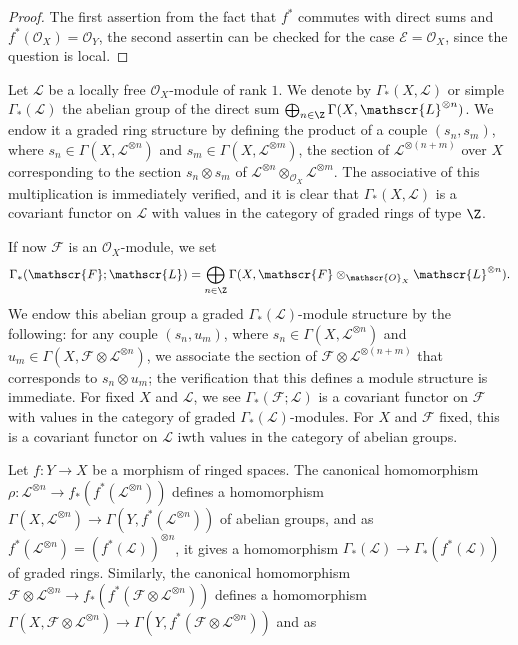 \begin{proof}
The first assertion from the fact that $f^*$ commutes with direct sums and $f^*(\mathscr{O}_X)=\mathscr{O}_Y$, the second assertin can be checked for the case $\mathscr{E}=\mathscr{O}_X$, since the question is local.
\end{proof}
Let $\mathscr{L}$ be a locally free $\mathscr{O}_X$-module of rank $1$. We denote by $\Gamma_*(X,\mathscr{L})$ or simple $\Gamma_*(\mathscr{L})$ the abelian group of the direct sum $\bigoplus_{n\in\Z}\Gamma(X,\mathscr{L}^{\otimes n})$. We endow it a graded ring structure by defining the product of a couple $(s_n,s_m)$, where $s_n\in\Gamma(X,\mathscr{L}^{\otimes n})$ and $s_m\in\Gamma(X,\mathscr{L}^{\otimes m})$, the section of $\mathscr{L}^{\otimes(n+m)}$ over $X$ corresponding to the section $s_n\otimes s_m$ of $\mathscr{L}^{\otimes n}\otimes_{\mathscr{O}_X}\mathscr{L}^{\otimes m}$. The associative of this multiplication is immediately verified, and it is clear that $\Gamma_*(X,\mathscr{L})$ is a covariant functor on $\mathscr{L}$ with values in the category of graded rings of type $\Z$.\par
If now $\mathscr{F}$ is an $\mathscr{O}_X$-module, we set
\[\Gamma_*(\mathscr{F};\mathscr{L})=\bigoplus_{n\in\Z}\Gamma(X,\mathscr{F}\otimes_{\mathscr{O}_X}\mathscr{L}^{\otimes n}).\]
We endow this abelian group a graded $\Gamma_*(\mathscr{L})$-module structure by the following: for any couple $(s_n,u_m)$, where $s_n\in\Gamma(X,\mathscr{L}^{\otimes n})$ and $u_m\in\Gamma(X,\mathscr{F}\otimes\mathscr{L}^{\otimes n})$, we associate the section of $\mathscr{F}\otimes\mathscr{L}^{\otimes(n+m)}$ that corresponds to $s_n\otimes u_m$; the verification that this defines a module structure is immediate. For fixed $X$ and $\mathscr{L}$, we see $\Gamma_*(\mathscr{F};\mathscr{L})$ is a covariant functor on $\mathscr{F}$ with values in the category of graded $\Gamma_*(\mathscr{L})$-modules. For $X$ and $\mathscr{F}$ fixed, this is a covariant functor on $\mathscr{L}$ iwth values in the category of abelian groups.\par
Let $f:Y\to X$ be a morphism of ringed spaces. The canonical homomorphism $\rho:\mathscr{L}^{\otimes n}\to f_*(f^*(\mathscr{L}^{\otimes n}))$ defines a homomorphism $\Gamma(X,\mathscr{L}^{\otimes n})\to\Gamma(Y,f^*(\mathscr{L}^{\otimes n}))$ of abelian groups, and as $f^*(\mathscr{L}^{\otimes n})=(f^*(\mathscr{L}))^{\otimes n}$, it gives a homomorphism $\Gamma_*(\mathscr{L})\to\Gamma_*(f^*(\mathscr{L}))$ of graded rings. Similarly, the canonical homomorphism $\mathscr{F}\otimes\mathscr{L}^{\otimes n}\to f_*(f^*(\mathscr{F}\otimes\mathscr{L}^{\otimes n}))$ defines a homomorphism $\Gamma(X,\mathscr{F}\otimes\mathscr{L}^{\otimes n})\to\Gamma(Y,f^*(\mathscr{F}\otimes\mathscr{L}^{\otimes n}))$ and as
